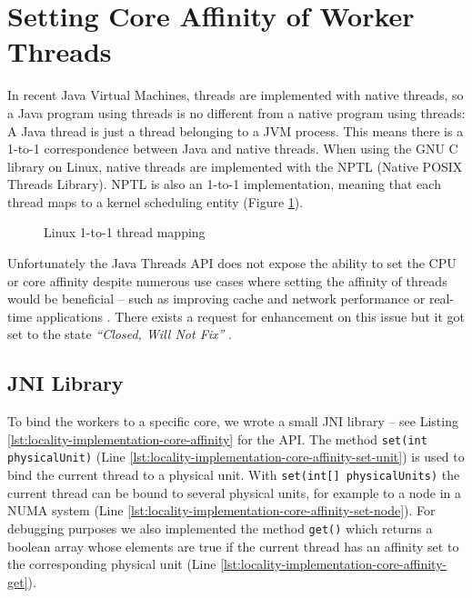 

\section{Setting Core Affinity of Worker Threads}
\label{sec:locality-implementation-core-affinity}

In recent Java Virtual Machines, threads are implemented with native
threads, so a Java program using threads is no different from a native
program using threads: A Java thread is just a thread belonging to a
JVM process. This means there is a 1-to-1 correspondence between Java
and native threads. When using the GNU C library on Linux, native
threads are implemented with the NPTL (Native POSIX Threads
Library). NPTL is also an 1-to-1 implementation, meaning that each
thread maps to a kernel scheduling entity (Figure
\ref{fig:locality-implementation-core-affinity-thread-mapping}).

\begin{figure}[htb]
  \centering
  \caption{Linux 1-to-1 thread mapping}
  \label{fig:locality-implementation-core-affinity-thread-mapping}
\end{figure}

Unfortunately the Java Threads API does not expose the ability to set
the CPU or core affinity despite numerous use cases where setting the
affinity of threads would be beneficial -- such as improving cache and
network performance or real-time applications \cite{Love2003, Dow2005,
  Foong2008}. There exists a request for enhancement on this issue but
it got set to the state \emph{``Closed, Will Not Fix''}
\cite{Oracle1999}.

\subsection{JNI Library}
\label{sec:locality-implementation-core-affinity-jni-library}

To bind the workers to a specific core, we wrote a small JNI library
-- see Listing \ref{lst:locality-implementation-core-affinity} for the
API. The method \lstinline!set(int physicalUnit)!  (Line
\ref{lst:locality-implementation-core-affinity-set-unit}) is used to
bind the current thread to a physical unit. With
\lstinline!set(int[] physicalUnits)! the current thread can be bound
to several physical units, for example to a node in a NUMA system
(Line \ref{lst:locality-implementation-core-affinity-set-node}). For
debugging purposes we also implemented the method \lstinline!get()!
which returns a boolean array whose elements are true if the current
thread has an affinity set to the corresponding physical unit (Line
\ref{lst:locality-implementation-core-affinity-get}).

